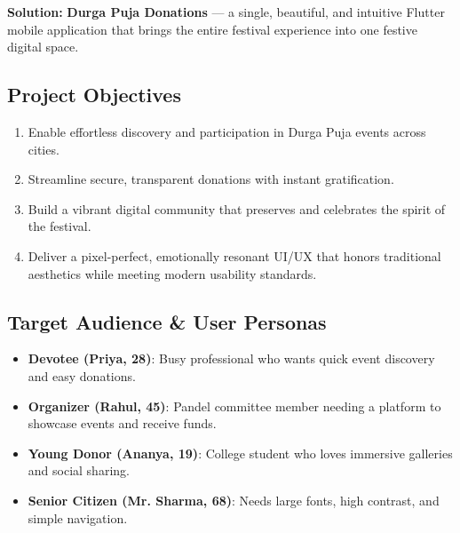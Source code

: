 \documentclass[11pt,a4paper]{article}
\begin{document}
\textbf{Solution:} \textbf{Durga Puja Donations} — a single, beautiful, and intuitive Flutter mobile application that brings the entire festival experience into one festive digital space.

\subsection{Project Objectives}
\begin{enumerate}
    \item Enable effortless discovery and participation in Durga Puja events across cities.
    \item Streamline secure, transparent donations with instant gratification.
    \item Build a vibrant digital community that preserves and celebrates the spirit of the festival.
    \item Deliver a pixel-perfect, emotionally resonant UI/UX that honors traditional aesthetics while meeting modern usability standards.
\end{enumerate}

\subsection{Target Audience \& User Personas}
\begin{itemize}
    \item \textbf{Devotee (Priya, 28)}: Busy professional who wants quick event discovery and easy donations.
    \item \textbf{Organizer (Rahul, 45)}: Pandel committee member needing a platform to showcase events and receive funds.
    \item \textbf{Young Donor (Ananya, 19)}: College student who loves immersive galleries and social sharing.
    \item \textbf{Senior Citizen (Mr. Sharma, 68)}: Needs large fonts, high contrast, and simple navigation.
\end{itemize}
\end{document}
